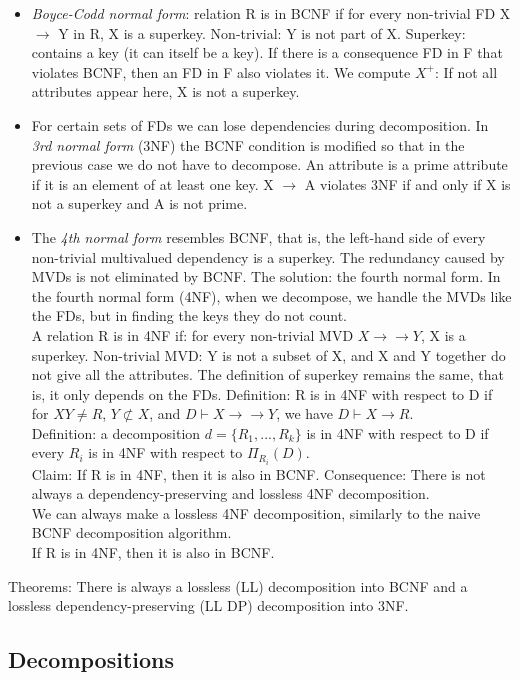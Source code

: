 \documentclass[margin=0px]{article}
\begin{document}
\begin{itemize}
    \item \textit{Boyce-Codd normal form}: relation R is in BCNF if for every non-trivial FD X $\to$ Y in R, X is a superkey. Non-trivial: Y is not part of X. Superkey: contains a key (it can itself be a key). If there is a consequence FD in F that violates BCNF, then an FD in F also violates it. We compute $X^+$: If not all attributes appear here, X is not a superkey.
    \item For certain sets of FDs we can lose dependencies during decomposition. In \textit{3rd normal form} (3NF) the BCNF condition is modified so that in the previous case we do not have to decompose. An attribute is a prime attribute if it is an element of at least one key. X $\to$ A violates 3NF if and only if X is not a superkey and A is not prime.
    \item The \textit{4th normal form} resembles BCNF, that is, the left-hand side of every non-trivial multivalued dependency is a superkey. The redundancy caused by MVDs is not eliminated by BCNF. The solution: the fourth normal form. In the fourth normal form (4NF), when we decompose, we handle the MVDs like the FDs, but in finding the keys they do not count.\\
          A relation R is in 4NF if: for every non-trivial MVD $X \to\to Y$, X is a superkey. Non-trivial MVD: Y is not a subset of X, and X and Y together do not give all the attributes. The definition of superkey remains the same, that is, it only depends on the FDs.
          Definition: R is in 4NF with respect to D if for $XY \neq R$, $Y \not\subset X$, and $D \vdash X \to\to Y$, we have $D \vdash X \to R$.\\
          Definition: a decomposition $d=\{R_1,...,R_k\}$ is in 4NF with respect to D if every $R_i$ is in 4NF with respect to $\Pi_{R_i}(D)$.\\
          Claim: If R is in 4NF, then it is also in BCNF. Consequence: There is not always a dependency-preserving and lossless 4NF decomposition.\\
          We can always make a lossless 4NF decomposition, similarly to the naive BCNF decomposition algorithm. \\
          If R is in 4NF, then it is also in BCNF.
\end{itemize}
Theorems: There is always a lossless (LL) decomposition into BCNF and a lossless dependency-preserving (LL DP) decomposition into 3NF.

\subsection{Decompositions}
\end{document}
